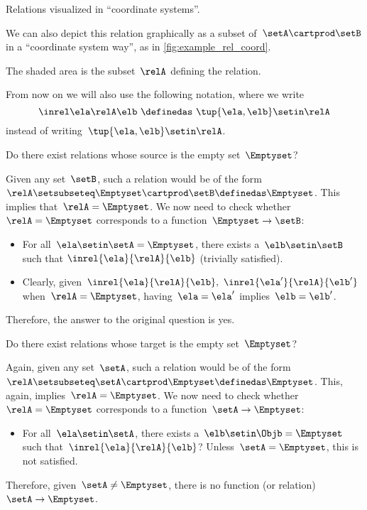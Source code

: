 \begin{marginfigure}
    \centering
    \caption{Relations visualized in ``coordinate systems''.}
    \label{fig:example_rel_coord}
\end{marginfigure}

We can also depict this relation graphically as a subset of~$\setA \cartprod \setB$ in a ``coordinate system way'', as in \cref{fig:example_rel_coord}.

The shaded area is the subset~$\relA$ defining the relation.

\begin{remark}
    From now on we will also use the following notation, where we write
    \begin{equation}
        \inrel \ela \relA \elb \ \definedas\  \tup{\ela,\elb}\setin \relA
    \end{equation}
    instead of writing~$\tup{\ela,\elb}\setin \relA$.
\end{remark}

\begin{exercise}
    Do there exist relations whose source is the empty set~$\Emptyset$?
\end{exercise}
\begin{solution}
    Given any set~$\setB$, such a relation would be of the form~$\relA \setsubseteq \Emptyset \cartprod \setB \definedas \Emptyset$.
    This implies that~$\relA=\Emptyset$.
    We now need to check whether~$\relA=\Emptyset$ corresponds to a function~$\Emptyset\to \setB$:
    \begin{itemize}
        \item For all~$\ela\setin \setA=\Emptyset$, there exists a~$\elb \setin \setB$ such that $\inrel{\ela}{\relA}{\elb}$ (trivially satisfied).
        \item Clearly, given~$\inrel{\ela}{\relA}{\elb},~\inrel{\ela'}{\relA}{\elb'}$ when~$\relA=\Emptyset$, having~$\ela=\ela'$ implies~$\elb=\elb'$.
    \end{itemize}
    Therefore, the answer to the original question is yes.
\end{solution}

\begin{exercise}
    Do there exist relations whose target is the empty set~$\Emptyset$?
\end{exercise}
\begin{solution}
    Again, given any set~$\setA$, such a relation would be of the form~$\relA \setsubseteq \setA \cartprod \Emptyset\definedas \Emptyset$.
    This, again, implies~$\relA=\Emptyset$.
    We now need to check whether~$\relA=\Emptyset$ corresponds to a function~$\setA \to \Emptyset$:
    \begin{itemize}
        \item For all~$\ela\setin \setA$, there exists a~$\elb\setin \Objb=\Emptyset$ such that~$\inrel{\ela}{\relA}{\elb}$?
              Unless~$\setA=\Emptyset$, this is not satisfied.
    \end{itemize}
    Therefore, given~$\setA \neq \Emptyset$, there is no function (or relation)~$\setA \to \Emptyset$.
\end{solution}

